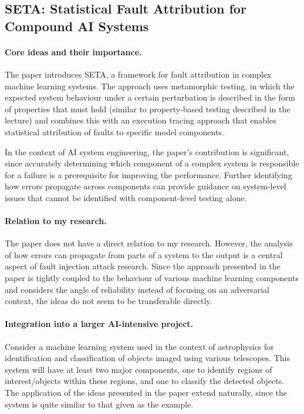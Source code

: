 \documentclass{article}
\begin{document}
\subsection{SETA: Statistical Fault Attribution for Compound AI Systems~\cite{chowdhury2026seta}}

\paragraph{Core ideas and their importance.}

The paper introduces SETA, a framework for fault attribution in complex machine learning systems. The approach uses metamorphic testing, in which the expected system behaviour under a certain perturbation is described in the form of properties that must hold (similar to property-based testing described in the lecture) and combines this with an execution tracing approach that enables statistical attribution of faults to specific model components.

In the context of AI system engineering, the paper's contribution is significant, since accurately determining which component of a complex system is responsible for a failure is a prerequisite for improving the performance. Further identifying how errors propagate across components can provide guidance on system-level issues that cannot be identified with component-level testing alone.

\paragraph{Relation to my research.}

The paper does not have a direct relation to my research. However, the analysis of how errors can propagate from parts of a system to the output is a central aspect of fault injection attack research. Since the approach presented in the paper is tightly coupled to the behaviour of various machine learning components and considers the angle of reliability instead of focusing on an adversarial context, the ideas do not seem to be transferable directly.

\paragraph{Integration into a larger AI-intensive project.}

Consider a machine learning system used in the context of astrophysics for identification and classification of objects imaged using various telescopes. This system will have at least two major components, one to identify regions of interest/objects within these regions, and one to classify the detected objects. The application of the ideas presented in the paper extend naturally, since the system is quite similar to that given as the example.
\end{document}
